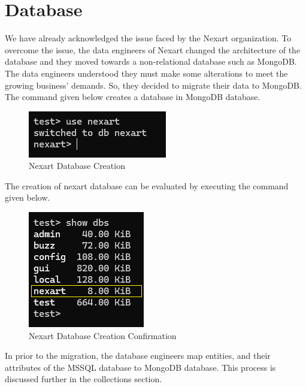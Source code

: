 \documentclass[a4Paper,12pt]{report}
\begin{document}
\section{Database}
We have already acknowledged the issue faced by the Nexart organization. To overcome the issue, the data engineers of Nexart changed the architecture of the database and they moved towards a non-relational database such as MongoDB. The data engineers understood they must make some alterations to meet the growing business' demands. So, they decided to migrate their data to MongoDB. The command given below creates a database in MongoDB database.
\begin{figure}[H]
\centering
\includegraphics[scale=0.8]{images/database_creation_shell.png}
\caption{Nexart Database Creation}
\end{figure}
The creation of nexart database can be evaluated by executing the command given below. 
\begin{figure}[H]
\centering
\includegraphics[scale=0.8]{images/database_creation_shell_confirmation.png}
\caption{Nexart Database Creation Confirmation}
\end{figure}
In prior to the migration, the database engineers map entities, and their attributes of the MSSQL database to MongoDB database. This process is discussed further in the collections section.
\end{document}
